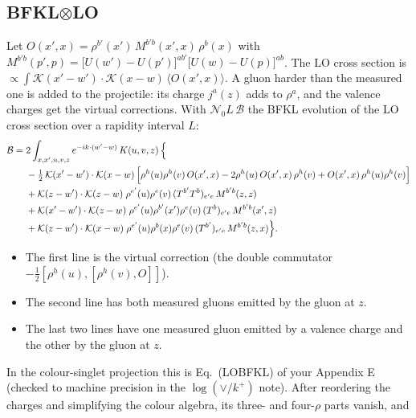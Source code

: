 \documentclass[10pt]{article}
\numberwithin{equation}{section}
\newcommand{\KK}{\mathcal K}
\newcommand{\NO}{\mathcal N_0}
\newcommand{\B}{\mathcal B}
\begin{document}
\subsection{BFKL\texorpdfstring{$\otimes$}{x}LO}\label{sec:Bop}
Let $O(x',x)=\rho^{b'}(x')\,M^{b'b}(x',x)\,\rho^b(x)$ with $M^{b'b}(p',p)=\big[U(w')-U(p')\big]^{ab'}\big[U(w)-U(p)\big]^{ab}$. The LO cross section is $\propto\int\KK(x'-w')\cdot\KK(x-w)\,\langle O(x',x)\rangle$. A gluon harder than the measured one is added to the projectile: its charge $j^a(z)$ adds to $\rho^a$, and the valence charges get the virtual corrections. With $\NO L\,\B$ the BFKL evolution of the LO cross section over a rapidity interval $L$:
\begin{align}
\B={}&2\int_{x,x',u,v,z}e^{-ik\cdot(w'-w)}\,K(u,v,z)\,\Big\{\notag\\
&-\tfrac12\,\KK(x'-w')\cdot\KK(x-w)\,\Big[\rho^h(u)\rho^h(v)\,O(x',x)-2\rho^h(u)\,O(x',x)\,\rho^h(v)+O(x',x)\,\rho^h(u)\rho^h(v)\Big]\notag\\
&+\KK(z-w')\cdot\KK(z-w)\;\rho^{e'}(u)\rho^e(v)\,(T^{b'}T^b)_{e'e}\,M^{b'b}(z,z)\notag\\
&+\KK(x'-w')\cdot\KK(z-w)\;\rho^{e'}(u)\rho^{b'}(x')\rho^e(v)\,(T^b)_{e'e}\,M^{b'b}(x',z)\notag\\
&+\KK(z-w')\cdot\KK(x-w)\;\rho^{e'}(u)\rho^{b}(x)\rho^e(v)\,(T^{b'})_{e'e}\,M^{b'b}(z,x)\Big\}.
\label{eq:Bop}
\end{align}
\begin{itemize}
\item The first line is the virtual correction (the double commutator $-\frac12[\rho^h(u),[\rho^h(v),O]]$).
\item The second line has both measured gluons emitted by the gluon at $z$.
\item The last two lines have one measured gluon emitted by a valence charge and the other by the gluon at $z$.
\end{itemize}
In the colour-singlet projection this is Eq.~(LOBFKL) of your Appendix E (checked to machine precision in the $\log(\vee/k^+)$ note). After reordering the charges and simplifying the colour algebra, its three- and four-$\rho$ parts vanish, and
\end{document}
